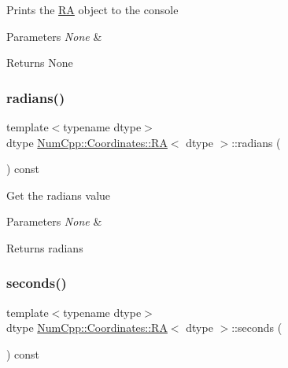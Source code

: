 Prints the \mbox{\hyperlink{class_num_cpp_1_1_coordinates_1_1_r_a}{RA}} object to the console


\begin{DoxyParams}{Parameters}
{\em None} & \\
\hline
\end{DoxyParams}
\begin{DoxyReturn}{Returns}
None 
\end{DoxyReturn}
\mbox{\label{class_num_cpp_1_1_coordinates_1_1_r_a_aa0b9dd49cc734b53a986851ef6b2d957}} 
\subsubsection{\texorpdfstring{radians()}{radians()}}
{\footnotesize\ttfamily template$<$typename dtype$>$ \\
dtype \mbox{\hyperlink{class_num_cpp_1_1_coordinates_1_1_r_a}{Num\+Cpp\+::\+Coordinates\+::\+RA}}$<$ dtype $>$\+::radians (\begin{DoxyParamCaption}{ }\end{DoxyParamCaption}) const\hspace{0.3cm}{\ttfamily [inline]}}

Get the radians value


\begin{DoxyParams}{Parameters}
{\em None} & \\
\hline
\end{DoxyParams}
\begin{DoxyReturn}{Returns}
radians 
\end{DoxyReturn}
\mbox{\label{class_num_cpp_1_1_coordinates_1_1_r_a_ac011791fc4029e74825a06f55ef13194}} 
\subsubsection{\texorpdfstring{seconds()}{seconds()}}
{\footnotesize\ttfamily template$<$typename dtype$>$ \\
dtype \mbox{\hyperlink{class_num_cpp_1_1_coordinates_1_1_r_a}{Num\+Cpp\+::\+Coordinates\+::\+RA}}$<$ dtype $>$\+::seconds (\begin{DoxyParamCaption}{ }\end{DoxyParamCaption}) const\hspace{0.3cm}{\ttfamily [inline]}}

